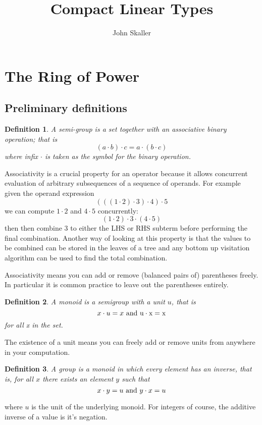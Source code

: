 \documentclass{article}
\title{Compact Linear Types}
\author{John Skaller}
\newtheorem{definition}{Definition}
\begin{document}
\maketitle
\section{The Ring of Power}
\subsection{Preliminary definitions}
\begin{definition}
A {\em semi-group} is a set together with an associative binary operation; that is
$$(a \cdot b)\cdot c = a \cdot (b \cdot c)$$
where infix $\cdot$ is taken as the symbol for the binary operation.
\end{definition}

Associativity is a crucial property for an operator because it allows concurrent
evaluation of arbitrary subsequences of a sequence of operands. For example given
the operand expression 
$$(((1\cdot2)\cdot3)\cdot4)\cdot5$$
we can compute $1\cdot2$ and $4\cdot5$ concurrently:
$$(1\cdot2)\cdot3\cdot(4\cdot5)$$
then then combine 3 to either the LHS or RHS subterm before performing the final combination.
Another way of looking at this property is that the values to be combined can be stored in
the leaves of a tree and any bottom up visitation algorithm can be used to find the total combination.

Associativity means you can add or remove (balanced pairs of) parentheses freely.
In particular it is common practice to leave out the parentheses entirely.

\begin{definition}
A {\em monoid} is a semigroup with a unit $u$, that is
$$x\cdot u = x \rm{\ and\ }u \cdot x = x$$
for all x in the set.
\end{definition}

The existence of a unit means you can freely add or remove units from
anywhere in your computation.

\begin{definition}
A {\em group} is a monoid in which every element has an inverse, that is,
for all $x$ there exists an element $y$ such that
$$x \cdot y = u {\rm\ and\ } y \cdot x = u $$
\end{definition}
where $u$ is the unit of the underlying monoid. For integers of course,
the additive inverse of a value is it's negation.
\end{document}
